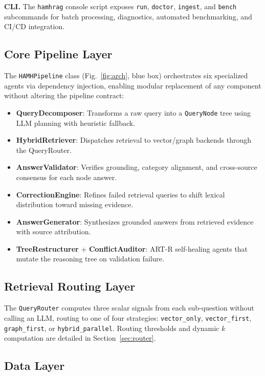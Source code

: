 \documentclass[conference]{IEEEtran}
\begin{document}
\textbf{CLI.} The \texttt{hamhrag} console script exposes \texttt{run},
\texttt{doctor}, \texttt{ingest}, and \texttt{bench} subcommands for batch
processing, diagnostics, automated benchmarking, and CI/CD integration.

\subsection{Core Pipeline Layer}

The \texttt{HAMHPipeline} class (Fig.~\ref{fig:arch}, blue box)
orchestrates six specialized agents via dependency injection, enabling
modular replacement of any component without altering the pipeline contract:

\begin{itemize}
  \item \textbf{QueryDecomposer}: Transforms a raw query into a
  \texttt{QueryNode} tree using LLM planning with heuristic fallback.
  \item \textbf{HybridRetriever}: Dispatches retrieval to vector/graph
  backends through the QueryRouter.
  \item \textbf{AnswerValidator}: Verifies grounding, category alignment,
  and cross-source consensus for each node answer.
  \item \textbf{CorrectionEngine}: Refines failed retrieval queries to
  shift lexical distribution toward missing evidence.
  \item \textbf{AnswerGenerator}: Synthesizes grounded answers from
  retrieved evidence with source attribution.
  \item \textbf{TreeRestructurer} + \textbf{ConflictAuditor}: ART-R
  self-healing agents that mutate the reasoning tree on validation failure.
\end{itemize}

\subsection{Retrieval Routing Layer}

The \texttt{QueryRouter} computes three scalar signals from each
sub-question without calling an LLM, routing to one of four strategies:
\texttt{vector\_only}, \texttt{vector\_first}, \texttt{graph\_first},
or \texttt{hybrid\_parallel}. Routing thresholds and dynamic $k$
computation are detailed in Section~\ref{sec:router}.

\subsection{Data Layer}
\end{document}
